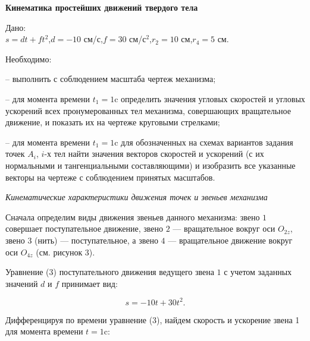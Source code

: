 \documentclass{article}
\begin{document}
\newpage

\begin{center}\large \textbf{Кинематика простейших движений твердого тела} \end{center}

\noindent Дано:\\
$s = d t + f t^2$,\quad $d = -10$ см/с,\quad $f = 30$ см/с$^2$,\quad $r_2 = 10$ см,\quad $r_4 = 5$ см.

\medskip

\noindent Необходимо:

-- выполнить с соблюдением масштаба чертеж механизма;

-- для момента времени $t_1=1$c определить значения угловых скоростей
и угловых ускорений всех пронумерованных тел механизма, совершающих вращательное движение,
и показать их на чертеже круговыми стрелками;

-- для момента времени $t_1=1$c для обозначенных на схемах вариантов задания
точек $A_i$, $i$-х тел найти значения векторов скоростей и ускорений
(с их нормальными и тангенциальными составляющими) и изобразить все указанные векторы
на чертеже с соблюдением принятых масштабов.
\bigskip 
\bigskip 
\bigskip 
\bigskip 
\bigskip
\bigskip
\bigskip
\bigskip
\bigskip
\bigskip
\bigskip
\bigskip
\bigskip
\bigskip
\bigskip 
\bigskip 
\bigskip 
\bigskip 
\bigskip
\bigskip
\bigskip
\bigskip
\bigskip
\bigskip
\bigskip
\bigskip
\bigskip
\bigskip
\bigskip
\bigskip
\bigskip
\bigskip
\begin{center} \end{center}

\newpage


\textit{\textsf{Кинематические характеристики движения точек  
и звеньев механизма}}

\bigskip 


Сначала определим виды движения звеньев данного механизма: звено $1$ совершает поступательное
движение, звено $2$ — вращательное вокруг оси $O_{2z}$, звено $3$ (нить) — поступательное, а звено
$4$ — вращательное движение вокруг оси $O_{4z}$ (см. рисунок 3).

Уравнение (3) поступательного движения ведущего звена $1$ с учетом заданных значений
$d$ и $f$ принимает вид:

\begin{equation}
  s = -10t + 30t^2\text{.}
\end{equation}

Дифференцируя по времени уравнение (3), найдем скорость и ускорение звена 1 для момента времени 
$t=1$c:
\end{document}

